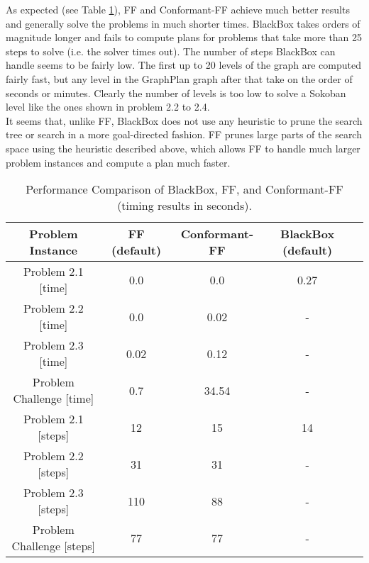 \documentclass[12pt]{article}
\begin{document}
\begin{enumerate}
    As expected (see Table \ref{table:results}), FF and Conformant-FF achieve much better results and generally solve the problems in much shorter times. BlackBox takes orders of magnitude longer and fails to compute plans for problems that take more than 25 steps to solve (i.e. the solver times out). The number of steps BlackBox can handle seems to be fairly low. The first up to 20 levels of the graph are computed fairly fast, but any level in the GraphPlan graph after that take on the order of seconds or minutes. Clearly the number of levels is too low to solve a Sokoban level like the ones shown in problem 2.2 to 2.4. \\
    It seems that, unlike FF, BlackBox does not use any heuristic to prune the search tree or search in a more goal-directed fashion. FF prunes large parts of the search space using the heuristic described above, which allows FF to handle much larger problem instances and compute a plan much faster. 
    
    \begin{table}%
    \label{table:results}
    \caption{Performance Comparison of BlackBox, FF, and Conformant-FF (timing results in seconds).}
    \begin{tabular*}{1.0\textwidth}{c|c|c|c|c}
    \hline
    \bfseries Problem Instance & \bfseries FF (default) & \bfseries Conformant-FF & \bfseries BlackBox (default) \\
    \hline\hline
    Problem 2.1 [time] 		&  0.0 	& 0.0 	& 0.27 	\\ \hline    
    Problem 2.2 [time] 		&  0.0	& 0.02 	& -	\\ \hline
    Problem 2.3 [time] 		&  0.02 & 0.12 	& -	\\ \hline
    Problem Challenge [time] 	&  0.7 	& 34.54 & -	\\ \hline\hline
    Problem 2.1 [steps]		&  12 	& 15 	& 14 	\\ \hline
    Problem 2.2 [steps]		&  31 	& 31 	& - 	\\ \hline
    Problem 2.3 [steps]		&  110 	& 88 	& - 	\\ \hline
    Problem Challenge [steps]	&  77 	& 77 	& - 	\\ \hline
    \hline
    \end{tabular*}
    \end{table}


\end{enumerate}
\end{document}

